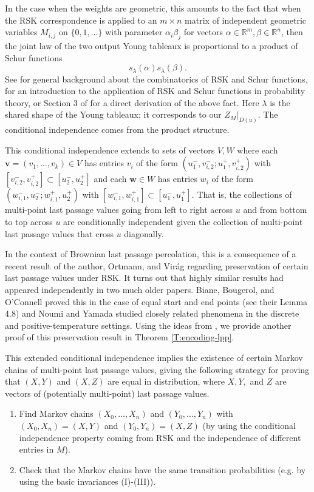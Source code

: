 \documentclass[aop, preprint]{imsart}
\theoremstyle{plain}
\theoremstyle{definition}
\theoremstyle{plain}
\newcommand{\sset}{\subset}
\newcommand{\la}{\lambda}
\newcommand{\al}{\alpha}
\newcommand{\be}{\beta}
\newcommand{\R}{\mathds{R}}
\newcommand{\bv}{\mathbf{v}}
\newcommand{\bw}{\mathbf{w}}
\begin{document}
 In the case when the weights are geometric, this amounts to the fact that when the RSK correspondence is applied to an $m \times n$ matrix of independent geometric variables $M_{i, j}$ on $\{0, 1, \dots\}$ with parameter $\al_i \be_j$ for vectors $\al \in \R^m, \be \in \R^n$, then the joint law of the two output Young tableaux is proportional to a product of Schur functions 
 \begin{equation}
 \label{E:Schur}
s_\la(\al) s_\la(\be).
 \end{equation} 
 See \cite{sagan2013symmetric} for general background about the combinatorics of RSK and Schur functions, \cite{borodin2016lectures} for an introduction to the application of RSK and Schur functions in probability theory, or Section 3 of \cite{o2003conditioned} for a direct derivation of the above fact.
 Here $\la$ is the shared shape of the Young tableaux; it corresponds to our $Z_M|_{D(u)}$. The conditional independence comes from the product structure.


This conditional independence extends to sets of vectors $V, W$ where each $\bv = (v_1, \dots, v_k) \in V$ has entries $v_i$ of the form $(u^-_1, v^-_{i,2} ; u^+_1, v^+_{i, 2})$ with $[v^-_{i,2}, v^+_{i, 2}] \sset [u^-_{2}, u^+_{2}]$ and each $\bw \in W$ has entries $w_i$ of the form $(w^-_{i,1}, u^-_2 ; w^+_{i,1}, u^+_2)$ with $[w^-_{i,1}, w^+_{i, 1}] \sset [u^-_{1}, u^+_{1}]$. That is, the collections of multi-point last passage values going from left to right across $u$ and from bottom to top across $u$ are conditionally independent given the collection of multi-point last passage values that cross $u$ diagonally.

In the context of Brownian last passage percolation, this is a consequence of a recent result of the author, Ortmann, and Vir\'ag \citep{DOV} regarding preservation of certain last passage values under RSK. It turns out that highly similar results had appeared independently in two much older papers. Biane, Bougerol, and O'Connell \cite{biane2005littelmann} proved this in the case of equal start and end points (see their Lemma 4.8) and Noumi and Yamada \citep{noumi2002tropical} studied closely related phenomena in the discrete and positive-temperature settings. 
 Using the ideas from \citep{noumi2002tropical}, we provide another proof of this preservation result in Theorem \ref{T:encoding-lpp}.

This extended conditional independence implies the existence of certain Markov chains of multi-point last passage values, giving the following strategy for proving that $(X, Y)$ and $(X, Z)$ are equal in distribution, where $X, Y,$ and $Z$ are vectors of (potentially multi-point) last passage values.
\begin{enumerate}
	\item Find Markov chains $(X_0, \dots, X_n)$ and $(Y_0, \dots, Y_n)$ with $(X_0, X_n) = (X, Y)$ and $(Y_0, Y_n) = (X, Z)$ (by using the conditional independence property coming from RSK and the independence of different entries in $M$).
	\item Check that the Markov chains have the same transition probabilities (e.g. by using the basic invariances (I)-(III)).
\end{enumerate}
\end{document}
